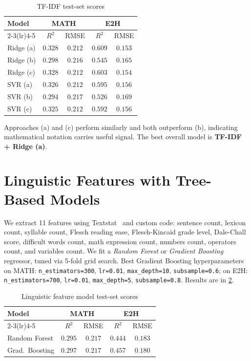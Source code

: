 \documentclass[twocolumn, 10pt]{article}
\begin{document}
\begin{table}[ht]
\centering
\caption{TF-IDF test-set scores}
\label{tab:tfidf}
\small
\begin{tabular}{lcccc}
\toprule
\multirow{2}{*}{\textbf{Model}} & \multicolumn{2}{c}{\textbf{MATH}} & \multicolumn{2}{c}{\textbf{E2H}} \\
\cmidrule(lr){2-3}\cmidrule(lr){4-5}
& $R^2$ & RMSE & $R^2$ & RMSE \\
\midrule
Ridge (a) & $0.328$ & $0.212$ & $0.609$ & $0.153$ \\
Ridge (b) & $0.298$ & $0.216$ & $0.545$ & $0.165$ \\
Ridge (c) & $0.328$ & $0.212$ & $0.603$ & $0.154$ \\
SVR (a)   & $0.326$ & $0.212$ & $0.595$ & $0.156$ \\
SVR (b)   & $0.294$ & $0.217$ & $0.526$ & $0.169$ \\
SVR (c)   & $0.325$ & $0.212$ & $0.592$ & $0.156$ \\
\bottomrule
\end{tabular}
\end{table}

Approaches (a) and (c) perform similarly and both outperform (b), indicating mathematical notation carries useful signal. The best overall model is \textbf{TF-IDF + Ridge (a)}.

\section{Linguistic Features with Tree-Based Models}
\label{sec:linguistic}

We extract 11 features using Textstat~\cite{textstat} and custom code: sentence count, lexicon count, syllable count, Flesch reading ease, Flesch-Kincaid grade level, Dale-Chall score, difficult words count, math expression count, numbers count, operators count, and variables count. We fit a \textit{Random Forest} or \textit{Gradient Boosting} regressor, tuned via 5-fold grid search. Best Gradient Boosting hyperparameters on MATH: \texttt{n\_estimators=300}, \texttt{lr=0.01}, \texttt{max\_depth=10}, \texttt{subsample=0.6}; on E2H: \texttt{n\_estimators=700}, \texttt{lr=0.01}, \texttt{max\_depth=5}, \texttt{subsample=0.8}. Results are in \cref{tab:ling}.

\begin{table}[ht]
\centering
\caption{Linguistic feature model test-set scores}
\label{tab:ling}
\small
\begin{tabular}{lcccc}
\toprule
\multirow{2}{*}{\textbf{Model}} & \multicolumn{2}{c}{\textbf{MATH}} & \multicolumn{2}{c}{\textbf{E2H}} \\
\cmidrule(lr){2-3}\cmidrule(lr){4-5}
& $R^2$ & RMSE & $R^2$ & RMSE \\
\midrule
Random Forest  & $0.295$ & $0.217$ & $0.444$ & $0.183$ \\
Grad.\ Boosting & $0.297$ & $0.217$ & $0.457$ & $0.180$ \\
\bottomrule
\end{tabular}
\end{table}
\end{document}

